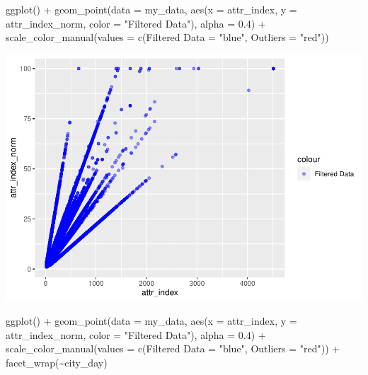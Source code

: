 \documentclass[
]{article}
\newenvironment{Shaded}{\begin{snugshade}}{\end{snugshade}}
\newcommand{\AttributeTok}[1]{\textcolor[rgb]{0.77,0.63,0.00}{#1}}
\newcommand{\FloatTok}[1]{\textcolor[rgb]{0.00,0.00,0.81}{#1}}
\newcommand{\FunctionTok}[1]{\textcolor[rgb]{0.00,0.00,0.00}{#1}}
\newcommand{\NormalTok}[1]{#1}
\newcommand{\OtherTok}[1]{\textcolor[rgb]{0.56,0.35,0.01}{#1}}
\newcommand{\SpecialCharTok}[1]{\textcolor[rgb]{0.00,0.00,0.00}{#1}}
\newcommand{\StringTok}[1]{\textcolor[rgb]{0.31,0.60,0.02}{#1}}
\begin{document}
\begin{Shaded}
\begin{Highlighting}[]
\FunctionTok{ggplot}\NormalTok{() }\SpecialCharTok{+} \FunctionTok{geom\_point}\NormalTok{(}\AttributeTok{data =}\NormalTok{ my\_data, }\FunctionTok{aes}\NormalTok{(}\AttributeTok{x =}\NormalTok{ attr\_index, }\AttributeTok{y =}\NormalTok{ attr\_index\_norm,}
    \AttributeTok{color =} \StringTok{"Filtered Data"}\NormalTok{), }\AttributeTok{alpha =} \FloatTok{0.4}\NormalTok{) }\SpecialCharTok{+} \FunctionTok{scale\_color\_manual}\NormalTok{(}\AttributeTok{values =} \FunctionTok{c}\NormalTok{(}\StringTok{\textasciigrave{}}\AttributeTok{Filtered Data}\StringTok{\textasciigrave{}} \OtherTok{=} \StringTok{"blue"}\NormalTok{,}
    \AttributeTok{Outliers =} \StringTok{"red"}\NormalTok{))}
\end{Highlighting}
\end{Shaded}

\includegraphics{Project_files/figure-latex/unnamed-chunk-18-1.pdf}

\begin{Shaded}
\begin{Highlighting}[]
\FunctionTok{ggplot}\NormalTok{() }\SpecialCharTok{+} \FunctionTok{geom\_point}\NormalTok{(}\AttributeTok{data =}\NormalTok{ my\_data, }\FunctionTok{aes}\NormalTok{(}\AttributeTok{x =}\NormalTok{ attr\_index, }\AttributeTok{y =}\NormalTok{ attr\_index\_norm,}
    \AttributeTok{color =} \StringTok{"Filtered Data"}\NormalTok{), }\AttributeTok{alpha =} \FloatTok{0.4}\NormalTok{) }\SpecialCharTok{+} \FunctionTok{scale\_color\_manual}\NormalTok{(}\AttributeTok{values =} \FunctionTok{c}\NormalTok{(}\StringTok{\textasciigrave{}}\AttributeTok{Filtered Data}\StringTok{\textasciigrave{}} \OtherTok{=} \StringTok{"blue"}\NormalTok{,}
    \AttributeTok{Outliers =} \StringTok{"red"}\NormalTok{)) }\SpecialCharTok{+} \FunctionTok{facet\_wrap}\NormalTok{(}\SpecialCharTok{\textasciitilde{}}\NormalTok{city\_day)}
\end{Highlighting}
\end{Shaded}
\end{document}

